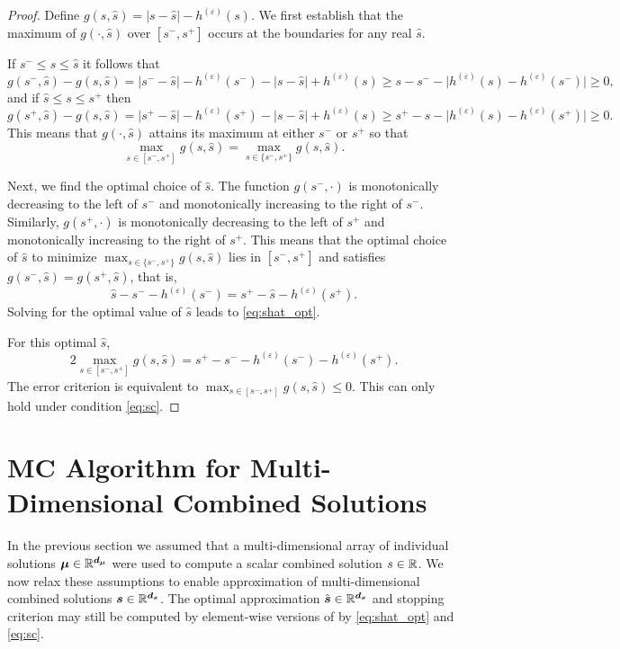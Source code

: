 \documentclass{article}[12pt]
\begin{document}
\begin{proof}
    Define $g(s,\hat{s})=\lvert s - \hat{s} \rvert -h^{(\varepsilon)}(s)$. We first establish that the maximum of $g(\cdot,\hat{s})$ over $[s^-,s^+]$ occurs at the boundaries for any real $\hat{s}$.  
    
    If  $s^- \leq s \leq \hat{s}$ it follows that 
    $$g(s^-,\hat{s})-g(s,\hat{s}) = \lvert s^- - \hat{s} \rvert -h^{(\varepsilon)}(s^-) - \lvert s - \hat{s} \rvert  + h^{(\varepsilon)}(s) \geq s - s^- - \lvert h^{(\varepsilon)}(s)-h^{(\varepsilon)}(s^-) \rvert \geq 0,$$
    and if $\hat{s} \leq s \leq s^+$ then 
    $$g(s^+,\hat{s})-g(s,\hat{s}) = \lvert s^+ - \hat{s} \rvert -h^{(\varepsilon)}(s^+) - \lvert s - \hat{s} \rvert  + h^{(\varepsilon)}(s) \geq s^+ - s - \lvert h^{(\varepsilon)}(s)-h^{(\varepsilon)}(s^+) \rvert \geq 0.$$
    This means that $g(\cdot,\hat{s})$ attains its maximum at either $s^-$ or $s^+$ so that
    \begin{equation*}
        \max_{s \in [s^-,s^+]} g(s,\hat{s}) = \max_{s \in \{s^-,s^+\}} g(s,\hat{s}).
    \end{equation*}
    
    Next, we find the optimal choice of $\hat{s}$.  The function $g(s^-,\cdot)$ is monotonically decreasing to the left of  $s^-$ and monotonically increasing to the right of $s^-$. Similarly, $g(s^+,\cdot)$ is monotonically decreasing to the left of $s^+$ and monotonically increasing to the right of $s^+$. This means that the optimal choice of $\hat{s}$ to minimize $\max_{s \in \{s^-,s^+\}} g(s,\hat{s})$ lies in $[s^-,s^+]$ and satisfies $g(s^-,\hat{s}) = g(s^+,\hat{s})$, that is, 
    $$\hat{s} - s^- - h^{(\varepsilon)}(s^-) = s^+ - \hat{s} - h^{(\varepsilon)}(s^+).$$
    Solving for the optimal value of $\hat{s}$ leads to \eqref{eq:shat_opt}.
    
    For this optimal $\hat{s}$, 
    $$2 \max_{s \in [s^-,s^+]} g(s,\hat{s}) =  s^+  -  s^-  - h^{(\varepsilon)}(s^-) - h^{(\varepsilon)}(s^+).$$
    The error criterion is equivalent to $\max_{s \in [s^-,s^+]} g(s,\hat{s}) \le 0 $.  This can only hold under condition  \eqref{eq:sc}. 
\end{proof}

\section{MC Algorithm for Multi-Dimensional Combined Solutions} \label{sec: Vectorized Implementation}

In the previous section we assumed that a multi-dimensional array of individual solutions $\boldsymbol{\mu} \in \mathbb{R}^{\boldsymbol{d}_{\boldsymbol{\mu}}}$ were used to compute a scalar combined solution $s \in \mathbb{R}$. We now relax these assumptions to enable approximation of multi-dimensional combined solutions $\boldsymbol{s} \in \mathbb{R}^{\boldsymbol{d}_{\boldsymbol{s}}}$. The optimal approximation $\hat{\boldsymbol{s}} \in \mathbb{R}^{\boldsymbol{d}_{\boldsymbol{s}}}$ and stopping criterion may still be computed by element-wise versions of by \eqref{eq:shat_opt} and \eqref{eq:sc}. 
\end{document}
